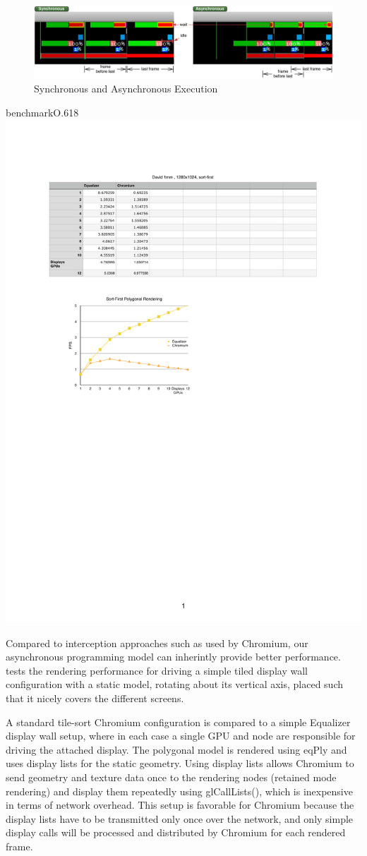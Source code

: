 \begin{figure}[ht!]\center
 \includegraphics[width=\textwidth]{images/syncAsync}
 {\caption{\label{fSyncAsync}Synchronous and Asynchronous Execution}}
\end{figure}

\begin{wrapfloat}{benchmark}{O}{.618\textwidth}
 \includegraphics[width=.618\textwidth]{results/cr}
 {\caption{\label{rCR}Driving a Tiled Display Wall}}
\end{wrapfloat}

Compared to interception approaches such as used by Chromium, our asynchronous
programming model can inherintly provide better performance.  tests
the rendering performance for driving a simple tiled display wall configuration
with a static model, rotating about its vertical axis, placed such that it
nicely covers the different screens.

A standard tile-sort Chromium configuration is compared to a simple Equalizer
display wall setup, where in each case a single GPU and node are responsible
for driving the attached display. The polygonal model is rendered using eqPly
and uses display lists for the static geometry. Using display lists allows
Chromium to send geometry and texture data once to the rendering nodes
(retained mode rendering) and display them repeatedly using
\textsf{glCallLists()}, which is inexpensive in terms of network overhead. This
setup is favorable for Chromium because the display lists have to be
transmitted only once over the network, and only simple display calls will be
processed and distributed by Chromium for each rendered frame.

